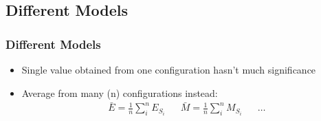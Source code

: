 \documentclass{beamer}
\begin{document}
\subsection{Different Models}\begin{frame}\frametitle{Different Models}\end{frame}%


\begin{frame}
\begin{itemize}
\item Single value obtained from one configuration hasn't much significance
\item Average from many (n) configurations instead:
\begin{align*}
\bar{E } = \frac{1}{n}\sum_i^n E_{S_i} && \bar{M } = \frac{1}{n}\sum_i^n M_{S_i}&&\ldots 
\end{align*}
\alert<2>{}
\end{itemize}
\end{frame}
\end{document}
